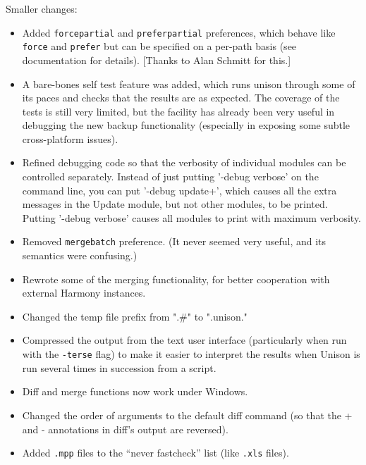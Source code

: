 \begin{changesfromversion}{2.17}
\item Smaller changes:
\begin{itemize}
\item Added \verb|forcepartial| and \verb|preferpartial|
preferences, which behave like \verb|force| and \verb|prefer| but can be
specified on a per-path basis (see documentation for details). [Thanks to
Alan Schmitt for this.]

\item A bare-bones self test feature was added, which runs unison through
  some of its paces and checks that the results are as expected.  The
  coverage of the tests is still very limited, but the facility has already
  been very useful in debugging the new backup functionality (especially in
  exposing some subtle cross-platform issues).

\item Refined debugging code so that the verbosity of individual modules
  can be controlled separately.  Instead of just putting '-debug
  verbose' on the command line, you can put '-debug update+', which
  causes all the extra messages in the Update module, but not other
  modules, to be printed.  Putting '-debug verbose' causes all modules
  to print with maximum verbosity.

\item Removed \verb|mergebatch| preference.  (It never seemed very useful, and
  its semantics were confusing.)
  
\item Rewrote some of the merging functionality, for better cooperation
  with external Harmony instances.

\item Changed the temp file prefix from ".#" to ".unison."

\item Compressed the output from the text user interface (particularly
  when run with the \verb|-terse| flag) to make it easier to interpret the
  results when Unison is run several times in succession from a script.

\item Diff and merge functions now work under Windows.

\item Changed the order of arguments to the default diff command (so that
  the + and - annotations in diff's output are reversed).

\item Added \verb|.mpp| files to the ``never fastcheck'' list (like
\verb|.xls| files). 
\end{itemize}


\end{changesfromversion}
